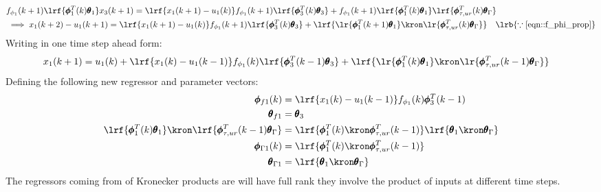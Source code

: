 \begin{align*}
      &f_{\phi_1}(k+1) \lrf{\pmb \phi_1^T(k) \pmb \theta_1} x_3(k+1)
                = \lrf{{x_1(k+1) - u_1(k)}} f_{\phi_1}(k+1)\lrf{\pmb \phi_3^T (k) \pmb \theta_3}
                + f_{\phi_1}(k+1)\lrf{\pmb \phi_1^T(k) \pmb \theta_1} \lrf{\pmb \phi^T_{\tau, ur}(k) \pmb \theta_\Gamma}\\
      &\implies {x_1(k+2) - u_1(k+1)} = \lrf{{x_1(k+1) - u_1(k)}} f_{\phi_1}(k+1)\lrf{\pmb \phi_3^T (k) \pmb \theta_3}
                + \lrf{ \lr{\pmb \phi_1^T(k+1) \pmb \theta_1} \kron \lr{\pmb \phi^T_{\tau, ur}(k) \pmb \theta_\Gamma}}
        \quad \lrb{\because \ref{eqn::f_phi_prop}}
\end{align*}
Writing in one time step ahead form:
\begin{align}
        x_1(k+1) &=  u_1(k)  +
                     \lrf{{x_1(k) - u_1(k-1)}} f_{\phi_1}(k)\lrf{\pmb \phi_3^T (k-1) \pmb \theta_3}+
                     \lrf{ \lr{\pmb \phi_1^T(k) \pmb \theta_1} \kron \lr{\pmb \phi^T_{\tau, ur}(k-1) \pmb \theta_\Gamma}}
        \label{eqn::r_nox_2}
\end{align}
Defining the following new regressor and parameter vectors:
\begin{align*}
        \pmb \phi_{f1}(k) &= \lrf{{x_1(k) - u_1(k-1)}} f_{\phi_1}(k) \pmb \phi_3^T (k-1)\\
        \pmb \theta_{f1} &= \pmb \theta_3 \\
        \lrf{\pmb \phi_1^T(k) \pmb \theta_1} \kron \lrf{\pmb \phi^T_{\tau, ur}(k-1) \pmb \theta_\Gamma} &=
             \lrf{ \pmb \phi_1^T(k) \kron \pmb \phi^T_{\tau, ur}(k-1) }
             \lrf{\pmb \theta_1 \kron \pmb \theta_\Gamma}\\
        \pmb \phi_{\Gamma 1} (k) &= \lrf{ \pmb \phi_1^T(k) \kron \pmb \phi^T_{\tau, ur}(k-1) } \\
        \pmb \theta_{\Gamma 1} &= \lrf{\pmb \theta_1 \kron \pmb \theta_\Gamma}
\end{align*}
The regressors coming from  of Kronecker products are will have full rank they involve the product of inputs at different time steps.
